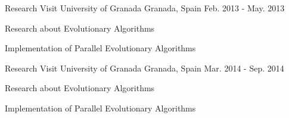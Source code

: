 


\begin{cventries}


\cventry
{Research Visit} %
{University of Granada} %
{Granada, Spain} %
{Feb. 2013 - May. 2013} %
{ %
\begin{cvitems}
\item {Research about Evolutionary Algorithms}
\item {Implementation of Parallel Evolutionary Algorithms}
\end{cvitems}
}


\cventry
{Research Visit} %
{University of Granada} %
{Granada, Spain} %
{Mar. 2014 - Sep. 2014} %
{ %
\begin{cvitems}
\item {Research about Evolutionary Algorithms}
\item {Implementation of Parallel Evolutionary Algorithms}
\end{cvitems}
}


\end{cventries}
